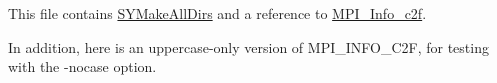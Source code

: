 This file contains \href{http://www.mcs.anl.gov/petsc/file.html}{SYMakeAllDirs} and a reference to \href{http://www/info.html}{MPI_Info_c2f}.

In addition, here is an uppercase-only version of MPI_INFO_C2F, for testing
with the -nocase option.
